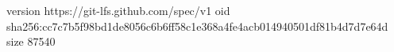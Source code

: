 version https://git-lfs.github.com/spec/v1
oid sha256:cc7c7b5f98bd1de8056c6b6ff58c1e368a4fe4acb014940501df81b4d7d7e64d
size 87540
